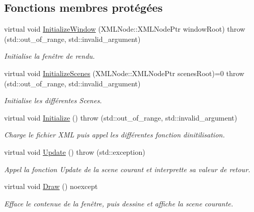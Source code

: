 \subsection*{Fonctions membres protégées}
\begin{DoxyCompactItemize}
\item 
virtual void \hyperlink{classmy_1_1GameManager_ab08492747a12e8eed0da29b22b9d84a4}{Initialize\+Window} (X\+M\+L\+Node\+::\+X\+M\+L\+Node\+Ptr window\+Root)  throw (std\+::out\+\_\+of\+\_\+range, std\+::invalid\+\_\+argument)
\begin{DoxyCompactList}\small\item\em Initialise la fenêtre de rendu. \end{DoxyCompactList}\item 
virtual void \hyperlink{classmy_1_1GameManager_a4374c551a764c9cea7c0f0ee5e2871ea}{Initialize\+Scenes} (X\+M\+L\+Node\+::\+X\+M\+L\+Node\+Ptr scenes\+Root)=0  throw (std\+::out\+\_\+of\+\_\+range, std\+::invalid\+\_\+argument)
\begin{DoxyCompactList}\small\item\em Initialise les différentes Scenes. \end{DoxyCompactList}\item 
\mbox{\label{classmy_1_1GameManager_a1c6298ac18a158b2a59143aff1e7beff}} 
virtual void \hyperlink{classmy_1_1GameManager_a1c6298ac18a158b2a59143aff1e7beff}{Initialize} ()  throw (std\+::out\+\_\+of\+\_\+range, std\+::invalid\+\_\+argument)
\begin{DoxyCompactList}\small\item\em Charge le fichier X\+ML puis appel les différentes fonction d\textquotesingle{}initilisation. \end{DoxyCompactList}\item 
virtual void \hyperlink{classmy_1_1GameManager_afb2475a81919fd9f60bc6d4f3655e39d}{Update} ()  throw (std\+::exception)
\begin{DoxyCompactList}\small\item\em Appel la fonction Update de la scene courant et interprette sa valeur de retour. \end{DoxyCompactList}\item 
\mbox{\label{classmy_1_1GameManager_a5df3d31f463a08dbd9b7447fa10d0fab}} 
virtual void \hyperlink{classmy_1_1GameManager_a5df3d31f463a08dbd9b7447fa10d0fab}{Draw} () noexcept
\begin{DoxyCompactList}\small\item\em Efface le contenue de la fenêtre, puis dessine et affiche la scene courante. \end{DoxyCompactList}\end{DoxyCompactItemize}
